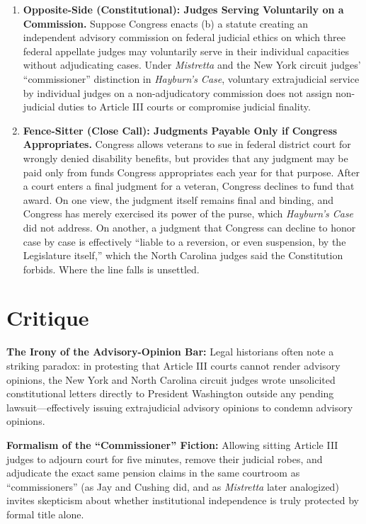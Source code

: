 \documentclass[12pt]{article}
\begin{document}
\begin{enumerate}
\item \textbf{Opposite-Side (Constitutional): Judges Serving Voluntarily on a Commission.} Suppose Congress enacts (b) a statute creating an independent advisory commission on federal judicial ethics on which three federal appellate judges may voluntarily serve in their individual capacities without adjudicating cases. Under \textit{Mistretta} and the New York circuit judges' ``commissioner'' distinction in \textit{Hayburn's Case}, voluntary extrajudicial service by individual judges on a non-adjudicatory commission does not assign non-judicial duties to Article III courts or compromise judicial finality.

\item \textbf{Fence-Sitter (Close Call): Judgments Payable Only if Congress Appropriates.} Congress allows veterans to sue in federal district court for wrongly denied disability benefits, but provides that any judgment may be paid only from funds Congress appropriates each year for that purpose. After a court enters a final judgment for a veteran, Congress declines to fund that award. On one view, the judgment itself remains final and binding, and Congress has merely exercised its power of the purse, which \textit{Hayburn's Case} did not address. On another, a judgment that Congress can decline to honor case by case is effectively ``liable to a reversion, or even suspension, by the Legislature itself,'' which the North Carolina judges said the Constitution forbids. Where the line falls is unsettled.

\end{enumerate}

\section{Critique}
\textbf{The Irony of the Advisory-Opinion Bar:} Legal historians often note a striking paradox: in protesting that Article III courts cannot render advisory opinions, the New York and North Carolina circuit judges wrote unsolicited constitutional letters directly to President Washington outside any pending lawsuit---effectively issuing extrajudicial advisory opinions to condemn advisory opinions.

\textbf{Formalism of the ``Commissioner'' Fiction:} Allowing sitting Article III judges to adjourn court for five minutes, remove their judicial robes, and adjudicate the exact same pension claims in the same courtroom as ``commissioners'' (as Jay and Cushing did, and as \textit{Mistretta} later analogized) invites skepticism about whether institutional independence is truly protected by formal title alone.
\end{document}
